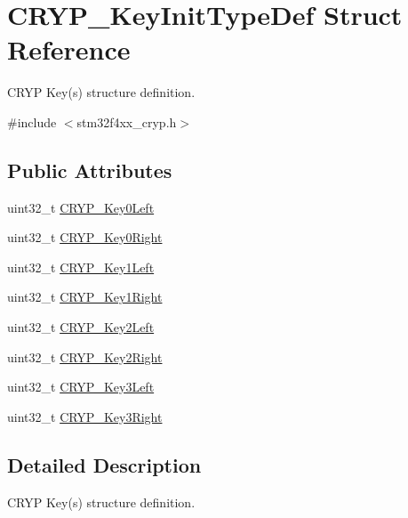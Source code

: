 \hypertarget{struct_c_r_y_p___key_init_type_def}{}\section{C\+R\+Y\+P\+\_\+\+Key\+Init\+Type\+Def Struct Reference}
\label{struct_c_r_y_p___key_init_type_def}


C\+R\+Y\+P Key(s) structure definition.  




{\ttfamily \#include $<$stm32f4xx\+\_\+cryp.\+h$>$}

\subsection*{Public Attributes}
\begin{DoxyCompactItemize}
\item 
uint32\+\_\+t \hyperlink{struct_c_r_y_p___key_init_type_def_a40168bcf70568a3fbccf282a9a6ef968}{C\+R\+Y\+P\+\_\+\+Key0\+Left}
\item 
uint32\+\_\+t \hyperlink{struct_c_r_y_p___key_init_type_def_a6c570ac1783582c73862aa8a9ec6c10d}{C\+R\+Y\+P\+\_\+\+Key0\+Right}
\item 
uint32\+\_\+t \hyperlink{struct_c_r_y_p___key_init_type_def_aca352f5af09f7d12e38d95e6c29e03bf}{C\+R\+Y\+P\+\_\+\+Key1\+Left}
\item 
uint32\+\_\+t \hyperlink{struct_c_r_y_p___key_init_type_def_a08bf87c29a0df961b92f31cf327fdc55}{C\+R\+Y\+P\+\_\+\+Key1\+Right}
\item 
uint32\+\_\+t \hyperlink{struct_c_r_y_p___key_init_type_def_acd33140c0954fda504be5ba5851b217a}{C\+R\+Y\+P\+\_\+\+Key2\+Left}
\item 
uint32\+\_\+t \hyperlink{struct_c_r_y_p___key_init_type_def_a94dd0a58f91f3b0efc09fe84f6af922d}{C\+R\+Y\+P\+\_\+\+Key2\+Right}
\item 
uint32\+\_\+t \hyperlink{struct_c_r_y_p___key_init_type_def_ae6a251405882c694e0d24a85e6d7222b}{C\+R\+Y\+P\+\_\+\+Key3\+Left}
\item 
uint32\+\_\+t \hyperlink{struct_c_r_y_p___key_init_type_def_afc24dd3ea3e7391f62ce4583ab4ae563}{C\+R\+Y\+P\+\_\+\+Key3\+Right}
\end{DoxyCompactItemize}


\subsection{Detailed Description}
C\+R\+Y\+P Key(s) structure definition. 

